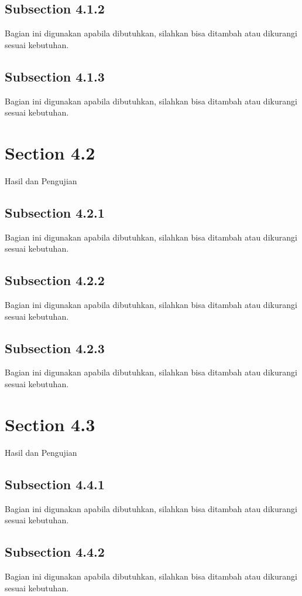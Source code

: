 \subsection{Subsection 4.1.2}
Bagian ini digunakan apabila dibutuhkan, silahkan bisa ditambah atau dikurangi sesuai kebutuhan.

\subsection{Subsection 4.1.3}
Bagian ini digunakan apabila dibutuhkan, silahkan bisa ditambah atau dikurangi sesuai kebutuhan.

\section{Section 4.2}
\noindent Hasil dan Pengujian

\subsection{Subsection 4.2.1}
Bagian ini digunakan apabila dibutuhkan, silahkan bisa ditambah atau dikurangi sesuai kebutuhan.

\subsection{Subsection 4.2.2}
Bagian ini digunakan apabila dibutuhkan, silahkan bisa ditambah atau dikurangi sesuai kebutuhan.

\subsection{Subsection 4.2.3}
Bagian ini digunakan apabila dibutuhkan, silahkan bisa ditambah atau dikurangi sesuai kebutuhan.

\section{Section 4.3}
Hasil dan Pengujian

\subsection{Subsection 4.4.1}
Bagian ini digunakan apabila dibutuhkan, silahkan bisa ditambah atau dikurangi sesuai kebutuhan.

\subsection{Subsection 4.4.2}
Bagian ini digunakan apabila dibutuhkan, silahkan bisa ditambah atau dikurangi sesuai kebutuhan.

